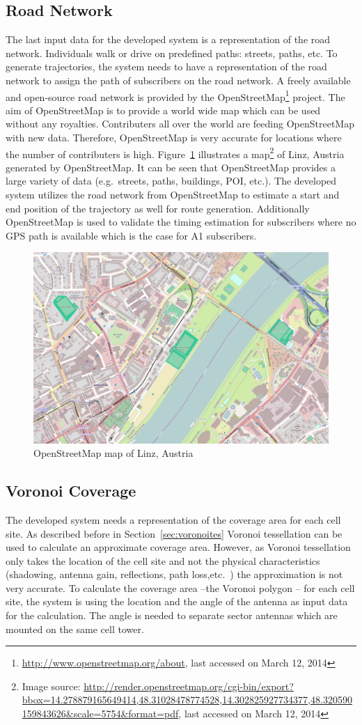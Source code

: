 \documentclass[master,english]{hgbthesis}
\begin{document}
\subsection{Road Network}
The last input data for the developed system is a representation of the road network. Individuals walk or drive on predefined paths: streets, paths, etc. To generate trajectories, the system needs to have a representation of the road network to assign the path of subscribers on the road network. A freely available and open-source road network is provided by the OpenStreetMap\footnote{\url{http://www.openstreetmap.org/about}, last accessed on March 12, 2014} project. The aim of OpenStreetMap is to provide a world wide map which can be used without any royalties. Contributers all over the world are feeding OpenStreetMap with new data. Therefore, OpenStreetMap is very accurate for locations where the number of contributers is high. Figure~\ref{fig:map_linz} illustrates a map\footnote{Image source: \url{http://render.openstreetmap.org/cgi-bin/export?bbox=14.278879165649414,48.31028478774528,14.302825927734377,48.320590159843626&scale=5754&format=pdf}, last accessed on March 12, 2014} of Linz, Austria generated by OpenStreetMap. It can be seen that OpenStreetMap provides a large variety of data (e.g.\ streets, paths, buildings, POI, etc.).
The developed system utilizes the road network from OpenStreetMap to estimate a start and end position of the trajectory as well for route generation. Additionally OpenStreetMap is used to validate the timing estimation for subscribers where no GPS path is available which is the case for A1 subscribers. 
\begin{figure}
	\centering
	\includegraphics[width=0.7\linewidth]{./images/map_linz}
	\caption{OpenStreetMap map of Linz, Austria}
	\label{fig:map_linz}
\end{figure}
\subsection{Voronoi Coverage}
The developed system needs a representation of the coverage area for each cell site. As described before in Section~\ref{sec:voronoites} Voronoi tessellation can be used to calculate an approximate coverage area. However, as Voronoi tessellation only takes the location of the cell site and not the physical characteristics (shadowing, antenna gain, reflections, path loss,etc.\ ) the approximation is not very accurate. To calculate the coverage area --the Voronoi polygon -- for each cell site, the system is using the location and the angle of the antenna as input data for the calculation. The angle is needed to separate sector antennas which are mounted on the same cell tower.
\end{document}
